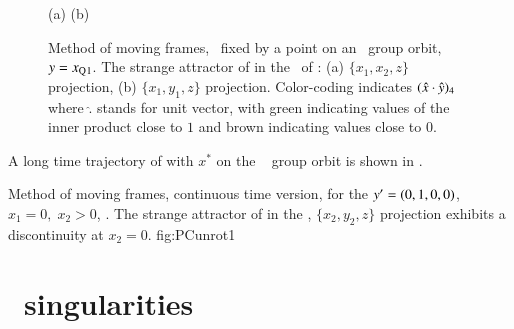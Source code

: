 %
\begin{figure}[ht]
\begin{center}
(a) %
(b) %
\end{center}
\caption{
Method of moving frames, \slice\ fixed by a point on an
\reqv\ group orbit, $y = x_{\mathrm{Q}_{}1}$. The strange
attractor of  in the \reducedsp\
of :
(a) $\{x_1,x_2,z\}$ projection,
(b) $\{x_1,y_1,z\}$ projection.
Color-coding indicates $(\hat{x} \cdot \hat{y})_4$
where $\hat{.}$ stands for unit vector, with green indicating values
of the inner product close to $1$ and brown indicating values
close to $0$.
    }
\label{fig:CLEpcSect}
\end{figure}
%
A long time trajectory of  with
$x^*$ on the \reqv\  group orbit is shown in
.


{}{
Method of moving frames, continuous time version, for the
${y'}=(0,1,0,0)$,
$x_1=0,\;x_2>0$, \slice. The strange attractor of
 in the \reducedsp,
$\{x_2,y_2,z\}$ projection exhibits a discontinuity at
$x_2=0$.
}
{fig:PCunrot1}


    \fi %
	
	
\section{\Slice\ singularities}
\label{sect:sliceSing}


